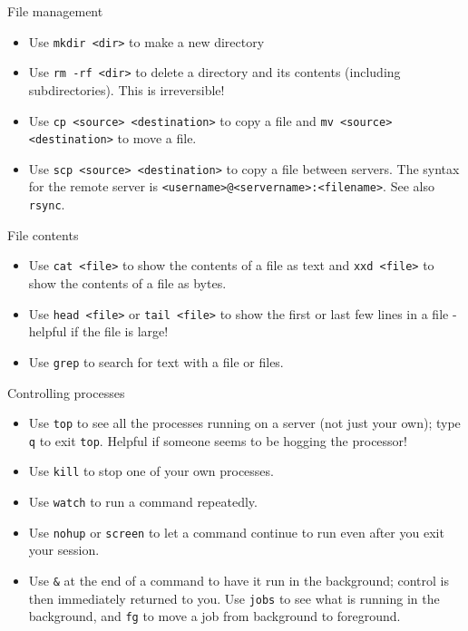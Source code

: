 \documentclass[dvipsnames]{beamer}
\newcommand{\command}[1]{\colorbox{light-gray}{\texttt{#1}}}
\newcommand{\filename}[1]{\colorbox{light-green}{\texttt{#1}}}
\begin{document}
\begin{frame}{File management}
  \begin{itemize}
  \item Use \command{mkdir <dir>} to make a new directory
  \item Use \command{rm -rf <dir>} to delete a directory and its contents (including subdirectories). This is irreversible!
  \item Use \command{cp <source> <destination>} to copy a file and \command{mv <source> <destination>} to move a file.
  \item Use \command{scp <source> <destination>} to copy a file between servers. The syntax for the remote server is \filename{<username>@<servername>:<filename>}. See also \command{rsync}.
  \end{itemize}
\end{frame}


\begin{frame}{File contents}
  \begin{itemize}
  \item Use \command{cat <file>} to show the contents of a file as text and \command{xxd <file>} to show the contents of a file as bytes.
  \item Use \command{head <file>} or \command{tail <file>} to show the first or last few lines in a file - helpful if the file is large!
  \item Use \command{grep} to search for text with a file or files.
  \end{itemize}
\end{frame}


\begin{frame}{Controlling processes}
  \begin{itemize}
  \item Use \command{top} to see all the processes running on a server (not just your own); type \command{q} to exit \command{top}. Helpful if someone seems to be hogging the processor!
  \item Use \command{kill} to stop one of your own processes.
  \item Use \command{watch} to run a command repeatedly.
  \item Use \command{nohup} or \command{screen} to let a command continue to run even after you exit your session.
  \item Use \command{\&} at the end of a command to have it run in the background; control is then immediately returned to you. Use \command{jobs} to see what is running in the background, and \command{fg} to move a job from background to foreground.
  \end{itemize}
\end{frame}
\end{document}
